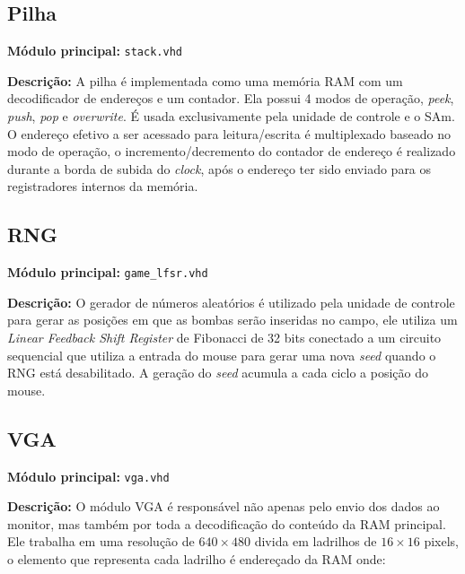 \documentclass[12pt]{article}
\begin{document}

\subsection{Pilha}
\label{sec:stack}

{\bf Módulo principal:} \verb|stack.vhd|

{\bf Descrição:} A pilha é implementada como uma memória RAM com um 
decodificador de endereços
e um contador. Ela possui 4 modos de operação, \emph{peek}, \emph{push},
\emph{pop} e \emph{overwrite}. É usada exclusivamente pela unidade de controle
e o SAm. O endereço efetivo a ser acessado para leitura/escrita é multiplexado
baseado no modo de operação, o incremento/decremento do contador de endereço é
realizado durante a borda de subida do \emph{clock}, após o endereço ter sido
enviado para os registradores internos da memória.


\subsection{RNG}
\label{sec:rng}

{\bf Módulo principal:} \verb|game_lfsr.vhd|

{\bf Descrição:} O gerador de números aleatórios é utilizado pela unidade de 
controle para gerar
as posições em que as bombas serão inseridas no campo, ele utiliza um 
\emph{Linear Feedback Shift Register} de Fibonacci de 32 bits conectado a um 
circuito sequencial que utiliza a entrada do mouse para gerar uma nova 
\emph{seed} quando o RNG está desabilitado. A geração do \emph{seed} acumula
a cada ciclo a posição do mouse.


\subsection{VGA}
\label{sec:vga}

{\bf Módulo principal:} \verb|vga.vhd|

{\bf Descrição:} O módulo VGA é responsável não apenas pelo envio dos dados ao
monitor, mas
também por toda a decodificação do conteúdo da RAM principal. Ele trabalha em
uma resolução de $640\times480$ divida em ladrilhos de $16\times16$ pixels, o
elemento que representa cada ladrilho é endereçado da RAM onde:
\end{document}
